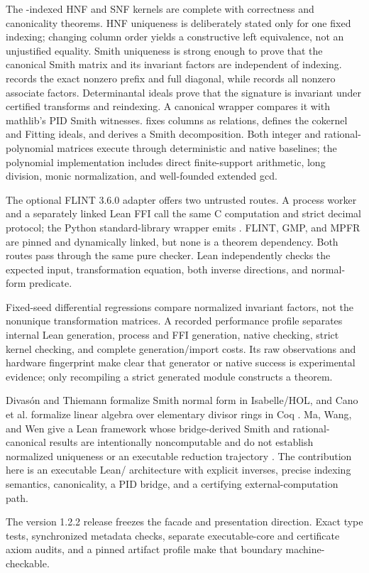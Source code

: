 The -indexed HNF and SNF kernels are complete with correctness and
canonicality theorems. HNF uniqueness is deliberately stated only for one
fixed indexing; changing column order yields a constructive left equivalence,
not an unjustified equality. Smith uniqueness is strong enough to prove that
the canonical  Smith matrix and its invariant factors are independent
of indexing.  records the exact nonzero prefix and full
diagonal, while  records all nonzero associate factors.
Determinantal ideals prove that the signature is invariant under certified
transforms and reindexing. A canonical wrapper compares it with mathlib's PID
Smith witnesses.  fixes columns as relations,
defines the cokernel and Fitting ideals, and derives a Smith decomposition.
Both integer and rational-polynomial matrices execute through deterministic
 and native baselines; the polynomial implementation includes
direct finite-support arithmetic, long division, monic normalization, and
well-founded extended gcd.

The optional FLINT 3.6.0 adapter offers two untrusted routes. A process worker
and a separately linked Lean FFI call the same C computation and strict decimal
protocol; the Python standard-library wrapper emits
. FLINT, GMP, and MPFR are pinned and dynamically
linked, but none is a theorem dependency. Both routes pass through the same
pure checker. Lean independently checks the expected input, transformation
equation, both inverse directions, and normal-form predicate.

Fixed-seed differential regressions compare normalized invariant factors, not
the nonunique transformation matrices. A recorded performance profile
separates internal Lean generation, process and FFI generation, native
checking, strict kernel checking, and complete generation/import costs. Its
raw observations and hardware fingerprint make clear that generator or native
success is experimental evidence; only recompiling a strict generated module
constructs a theorem.

Divas\'on and Thiemann formalize Smith normal form in Isabelle/HOL, and Cano
et al. formalize linear algebra over elementary divisor rings in Coq
\citep{divasonThiemann2022snf,cano2016coq}. Ma, Wang, and Wen give a Lean
framework whose bridge-derived Smith and rational-canonical results are
intentionally noncomputable and do not establish normalized uniqueness or an
executable reduction trajectory \citep[Sections 3.4, 5.1, and
6.2]{maWangWen2026}. The contribution here is an executable Lean/\mathlib
architecture with explicit inverses, precise indexing semantics, canonicality,
a PID bridge, and a certifying external-computation path.

The version 1.2.2 release freezes the facade and presentation direction. Exact
type tests, synchronized metadata checks, separate executable-core and
certificate axiom audits, and a pinned artifact profile make that boundary
machine-checkable.
